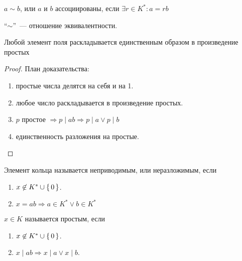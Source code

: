 \begin{define*}
  $a \sim b$, или $a$ и $b$ ассоциированы, если $\exists r \in K^* : a = rb$
\end{define*}

\begin{exercise}
  ``$\sim$''~--- отношение эквивалентности.
\end{exercise}

\begin{Th}
  Любой элемент поля раскладывается единственным образом в произведение простых
\end{Th}
\begin{proof}
  План доказательства:
  \begin{enumerate}
    \item простые числа делятся на себя и на 1.
    \item любое число раскладывается в произведение простых.
    \item $p$ простое $\Rightarrow p \mid ab \Longrightarrow p \mid a \lor p \mid b$
    \item единственность разложения на простые.
  \end{enumerate}
\end{proof}

\begin{define*}
  Элемент кольца называется неприводимым, или неразложимым, если 
  \begin{enumerate}
      \item $x \not\in K^* \cup \set{0}$.
      \item $x = ab \Longrightarrow a \in K^* \lor b \in K^*$
  \end{enumerate}
\end{define*}

\begin{define*}
  $x \in K$ называется простым, если
  \begin{enumerate}
    \item $x \not\in K^* \cup \set{0}$.
    \item $x \mid ab \Longrightarrow x \mid a \lor x \mid b$.
  \end{enumerate}
\end{define*}



